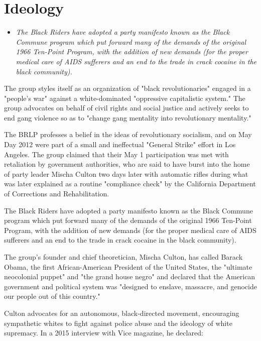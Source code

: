\section{Ideology}\label{ideology}

\begin{itemize}
\item
  \emph{The Black Riders have adopted a party manifesto known as the
  Black Commune program which put forward many of the demands of the
  original 1966 Ten-Point Program, with the addition of new demands (for
  the proper medical care of AIDS sufferers and an end to the trade in
  crack cocaine in the black community).}
\end{itemize}

The group styles itself as an organization of "black revolutionaries"
engaged in a "people's war" against a white-dominated "oppressive
capitalistic system." The group advocates on behalf of civil rights and
social justice and actively seeks to end gang violence so as to "change
gang mentality into revolutionary mentality."

The BRLP professes a belief in the ideas of revolutionary socialism, and
on May Day 2012 were part of a small and ineffectual "General Strike"
effort in Los Angeles. The group claimed that their May 1 participation
was met with retaliation by government authorities, who are said to have
burst into the home of party leader Mischa Culton two days later with
automatic rifles during what was later explained as a routine
"compliance check" by the California Department of Corrections and
Rehabilitation.

The Black Riders have adopted a party manifesto known as the Black
Commune program which put forward many of the demands of the original
1966 Ten-Point Program, with the addition of new demands (for the proper
medical care of AIDS sufferers and an end to the trade in crack cocaine
in the black community).

The group's founder and chief theoretician, Mischa Culton, has called
Barack Obama, the first African-American President of the United States,
the "ultimate neocolonial puppet" and "the grand house negro" and
declared that the American government and political system was "designed
to enslave, massacre, and genocide our people out of this country."

Culton advocates for an autonomous, black-directed movement, encouraging
sympathetic whites to fight against police abuse and the ideology of
white supremacy. In a 2015 interview with Vice magazine, he declared:

